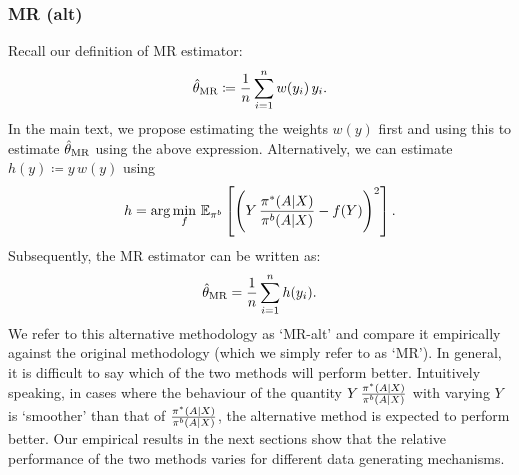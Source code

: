 \subsubsection{MR (alt)}\label{sec:alt-estimation-method}
Recall our definition of MR estimator:
\[
\hat{\theta}_{\textup{MR}} \coloneqq \frac{1}{n} \sum_{i=1}^n w(y_i)\,y_i.
\]
In the main text, we propose estimating the weights $w(y)$ first and using this to estimate $\hat{\theta}_{\textup{MR}}$ using the above expression. Alternatively, we can estimate $h(y) \coloneqq y\,w(y)$ using 
\begin{align*}
    h = \arg\min_{f} \, \mathbb{E}_{\pi^b} \left[ \Bigg(Y\,\frac{\pi^*(A|X)}{\pi^b (A|X)}-f(Y)\Bigg)^2\right].
\end{align*}
Subsequently, the MR estimator can be written as:
\[
\hat{\theta}_{\textup{MR}} = \frac{1}{n}\sum_{i=1}^n h(y_i).
\]
We refer to this alternative methodology as `MR-alt' and compare it empirically against the original methodology (which we simply refer to as `MR'). 
In general, it is difficult to say which of the two methods will perform better. Intuitively speaking, in cases where the behaviour of the quantity $Y\,\frac{\pi^*(A|X)}{\pi^b (A|X)}$ with varying $Y$ is `smoother' than that of $\frac{\pi^*(A|X)}{\pi^b (A|X)}$, the alternative method is expected to perform better. Our empirical results in the next sections show that the relative performance of the two methods varies for different data generating mechanisms.



